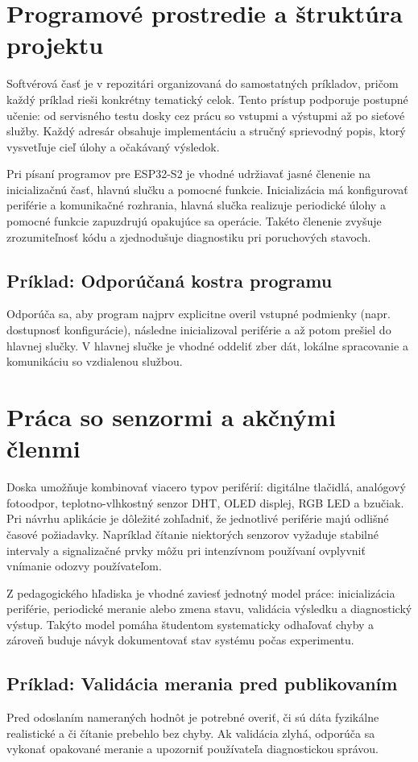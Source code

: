 \section{Programové prostredie a štruktúra projektu}
Softvérová časť je v repozitári organizovaná do samostatných príkladov, pričom každý príklad rieši konkrétny tematický celok. Tento prístup podporuje postupné učenie: od servisného testu dosky cez prácu so vstupmi a výstupmi až po sieťové služby. Každý adresár obsahuje implementáciu a stručný sprievodný popis, ktorý vysvetľuje cieľ úlohy a očakávaný výsledok.

Pri písaní programov pre ESP32-S2 je vhodné udržiavať jasné členenie na inicializačnú časť, hlavnú slučku a pomocné funkcie. Inicializácia má konfigurovať periférie a komunikačné rozhrania, hlavná slučka realizuje periodické úlohy a pomocné funkcie zapuzdrujú opakujúce sa operácie. Takéto členenie zvyšuje zrozumiteľnosť kódu a zjednodušuje diagnostiku pri poruchových stavoch.

\subsection{Príklad: Odporúčaná kostra programu}
Odporúča sa, aby program najprv explicitne overil vstupné podmienky (napr. dostupnosť konfigurácie), následne inicializoval periférie a až potom prešiel do hlavnej slučky. V hlavnej slučke je vhodné oddeliť zber dát, lokálne spracovanie a komunikáciu so vzdialenou službou.

\section{Práca so senzormi a akčnými členmi}
Doska umožňuje kombinovať viacero typov periférií: digitálne tlačidlá, analógový fotoodpor, teplotno-vlhkostný senzor DHT, OLED displej, RGB LED a bzučiak. Pri návrhu aplikácie je dôležité zohľadniť, že jednotlivé periférie majú odlišné časové požiadavky. Napríklad čítanie niektorých senzorov vyžaduje stabilné intervaly a signalizačné prvky môžu pri intenzívnom používaní ovplyvniť vnímanie odozvy používateľom.

Z pedagogického hľadiska je vhodné zaviesť jednotný model práce: inicializácia periférie, periodické meranie alebo zmena stavu, validácia výsledku a diagnostický výstup. Takýto model pomáha študentom systematicky odhaľovať chyby a zároveň buduje návyk dokumentovať stav systému počas experimentu.

\subsection{Príklad: Validácia merania pred publikovaním}
Pred odoslaním nameraných hodnôt je potrebné overiť, či sú dáta fyzikálne realistické a či čítanie prebehlo bez chyby. Ak validácia zlyhá, odporúča sa vykonať opakované meranie a upozorniť používateľa diagnostickou správou.


